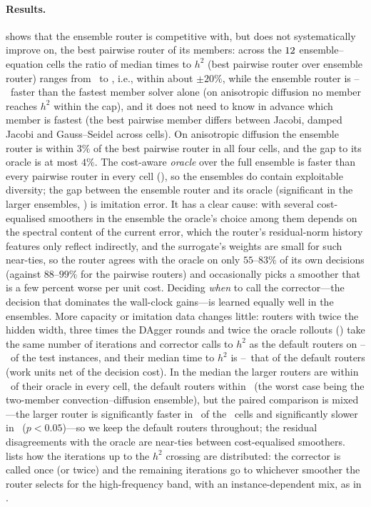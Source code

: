 \paragraph{Results.}  shows that the ensemble router is competitive with, but does not systematically improve on, the best pairwise router of its members: across the $12$ ensemble--equation cells the ratio of median times to $h^2$ (best pairwise router over ensemble router) ranges from \caEnsVsPairMin\ to \caEnsVsPairMax, i.e., within about $\pm 20\%$, while the ensemble router is \caEnsVsSolverMin--\caEnsVsSolverMax\ faster than the fastest member solver alone (on anisotropic diffusion no member reaches $h^2$ within the cap), and it does not need to know in advance which member is fastest (the best pairwise member differs between Jacobi, damped Jacobi and Gauss--Seidel across cells). On anisotropic diffusion the ensemble router is within $3\%$ of the best pairwise router in all four cells, and the gap to its oracle is at most $4\%$. The cost-aware \emph{oracle} over the full ensemble is faster than every pairwise router in every cell (), so the ensembles do contain exploitable diversity; the gap between the ensemble router and its oracle (significant in the larger ensembles, ) is imitation error. It has a clear cause: with several cost-equalised smoothers in the ensemble the oracle's choice among them depends on the spectral content of the current error, which the router's residual-norm history features only reflect indirectly, and the surrogate's weights are small for such near-ties, so the router agrees with the oracle on only $55$--$83\%$ of its own decisions (against $88$--$99\%$ for the pairwise routers) and occasionally picks a smoother that is a few percent worse per unit cost. Deciding \emph{when} to call the corrector---the decision that dominates the wall-clock gains---is learned equally well in the ensembles. More capacity or imitation data changes little: routers with twice the hidden width, three times the DAgger rounds and twice the oracle rollouts () take the same number of iterations and corrector calls to $h^2$ as the default routers on \caEnsBigSameMin--\caEnsBigSameMax\ of the test instances, and their median time to $h^2$ is \caEnsBigRatioMin--\caEnsBigRatioMax\ that of the default routers (work units net of the decision cost). In the median the larger routers are within \caEnsBigGapMax\ of their oracle in every cell, the default routers within \caEnsGapWuMax\ (the worst case being the two-member convection--diffusion ensemble), but the paired comparison is mixed---the larger router is significantly faster in \caEnsBigNFaster\ of the \caNumEnsBig\ cells and significantly slower in \caEnsBigNSlower\ ($p < 0.05$)---so we keep the default routers throughout; the residual disagreements with the oracle are near-ties between cost-equalised smoothers.  lists how the iterations up to the $h^2$ crossing are distributed: the corrector is called once (or twice) and the remaining iterations go to whichever smoother the router selects for the high-frequency band, with an instance-dependent mix, as in .

